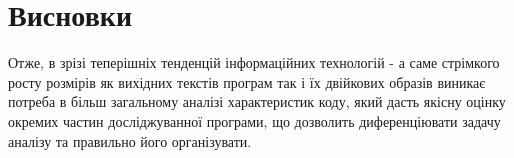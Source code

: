 \section*{Висновки}
Отже, в зрізі теперішніх тенденцій інформаційних технологій  - а саме стрімкого росту розмірів як вихідних текстів програм так і їх двійкових образів виникає потреба в більш загальному аналізі характеристик коду, який дасть якісну оцінку окремих частин досліджуванної програми, що дозволить диференціювати задачу аналізу та правильно його організувати.
